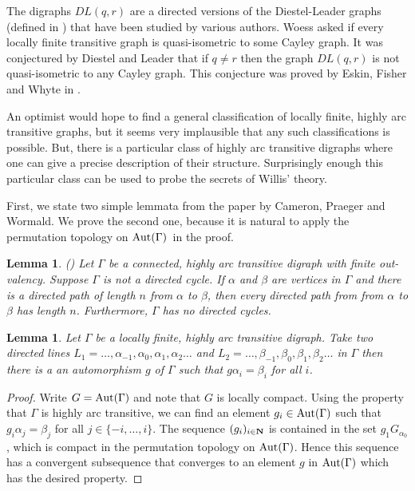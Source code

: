 \documentclass{emsprocart}
\newtheorem{lemma}[theorem]{Lemma}
\theoremstyle{definition}
\begin{document}
\medskip

The digraphs $DL(q,r)$ are a directed versions of the Diestel-Leader
graphs (defined in \cite{DiestelLeader2001}) that have been studied by
various authors.  Woess \cite{Woess1992} asked if every locally finite
transitive graph is quasi-isometric to some Cayley graph.
It was conjectured by Diestel and Leader  that if
$q\neq r$ then the graph $DL(q,r)$ is
not quasi-isometric to any Cayley graph.
  This  conjecture  was proved  by Eskin,
Fisher and Whyte in \cite{EskinFisherWhyte2005}.

An optimist would hope to find a general classification of
locally finite,
highly arc transitive graphs, but
it seems very implausible that any such
classifications is possible.
But, there is a particular class of highly arc transitive digraphs
where one can give a precise description of their
structure. Surprisingly enough this particular class can be used to
probe the secrets of Willis' theory.

First, we state two simple lemmata from the paper \cite{CPW1993}
by Cameron, Praeger and
Wormald.   We prove the second one, because it is natural to apply the
permutation topology on {\mbox{${\rm Aut}(\Gamma)$}}\ in the proof.

\begin{lemma}\label{LCPW}
{\rm (\cite[Proposition~3.10]{CPW1993})}  Let $\Gamma$ be a connected,
highly arc transitive digraph with finite out-valency.  Suppose
$\Gamma$ is not a directed cycle.  If $\alpha$ and $\beta$ are vertices
in $\Gamma$ and there is a directed path of length $n$ from $\alpha$
to $\beta$, then every directed path from from $\alpha$ to $\beta$ has
length $n$.  Furthermore, $\Gamma$ has no directed cycles.
\end{lemma}

\begin{lemma}\label{LTransitveLines}
Let $\Gamma$ be a  locally finite, highly arc transitive digraph.
Take two directed lines
$L_1=\ldots, \alpha_{-1}, \alpha_0, \alpha_1, \alpha_2\ldots$
and $L_2=\ldots, \beta_{-1}, \beta_0, \beta_1, \beta_2\ldots$  in $\Gamma$ then there is a an automorphism $g$ of
$\Gamma$ such that $g\alpha_i=\beta_i$ for all $i$.
\end{lemma}

\begin{proof}  Write $G={\mbox{${\rm Aut}(\Gamma)$}}$ and note that $G$ is locally compact.
Using the property that $\Gamma$ is highly arc transitive,
we can find an element $g_i\in {\mbox{${\rm Aut}(\Gamma)$}}$ such that $g_i\alpha_j=\beta_j$
for all $j\in\{-i,\ldots,i\}$.  The sequence $(g_i)_{i\in {\bf N}}$ is contained in
  the set $g_1G_{\alpha_0}$, which is compact in the permutation
  topology on ${\mbox{${\rm Aut}(\Gamma)$}}$.  Hence this sequence has a convergent
  subsequence that converges to an element $g$ in ${\mbox{${\rm Aut}(\Gamma)$}}$ which has
  the desired property.  \end{proof}
\end{document}
